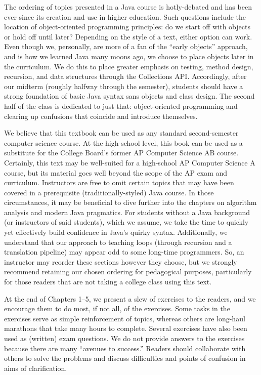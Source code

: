 The ordering of topics presented in a Java course is hotly-debated and has been ever since its creation and use in higher education. 
Such questions include the location of object-oriented programming principles: do we start off with objects or hold off until later? 
Depending on the style of a text, either option can work. 
Even though we, personally, are more of a fan of the ``early objects'' approach, and is how we learned Java many moons ago, we choose to place objects later in the curriculum. 
We do this to place greater emphasis on testing, method design, recursion, and data structures through the Collections API. 
Accordingly, after our midterm (roughly halfway through the semester), students should have a strong foundation of basic Java syntax sans objects and class design. 
The second half of the class is dedicated to just that: object-oriented programming and clearing up confusions that coincide and introduce themselves. 

We believe that this textbook can be used as any standard second-semester computer science course. 
At the high-school level, this book can be used as a substitute for the College Board's former AP Computer Science AB course. 
Certainly, this text may be well-suited for a high-school AP Computer Science A course, but its material goes well beyond the scope of the AP exam and curriculum.
Instructors are free to omit certain topics that may have been covered in a prerequisite (traditionally-styled) Java course. 
In those circumstances, it may be beneficial to dive further into the chapters on algorithm analysis and modern Java pragmatics. 
For students without a Java background (or instructors of said students), which we assume, we take the time to quickly yet effectively build confidence in Java's quirky syntax. 
Additionally, we understand that our approach to teaching loops (through recursion and a translation pipeline) may appear odd to some long-time programmers. 
So, an instructor may reorder these sections however they choose, but we strongly recommend retaining our chosen ordering for pedagogical purposes, particularly for those readers that are not taking a college class using this text. 

At the end of Chapters 1--5, we present a slew of exercises to the readers, and we encourage them to do most, if not all, of the exercises.
Some tasks in the exercises serve as simple reinforcement of topics, whereas others are long-haul marathons that take many hours to complete. 
Several exercises have also been used as (written) exam questions.
We do not provide answers to the exercises because there are many ``avenues to success.''
Readers should collaborate with others to solve the problems and discuss difficulties and points of confusion in aims of clarification.


